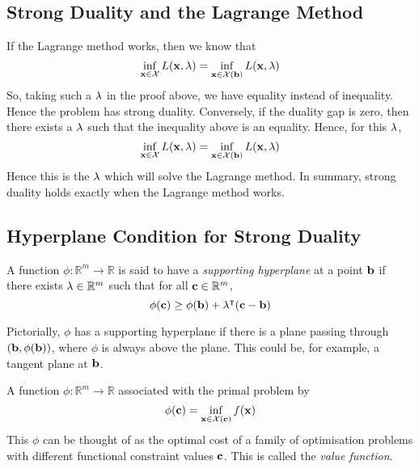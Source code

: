 \subsection{Strong Duality and the Lagrange Method}
If the Lagrange method works, then we know that
\[
	\inf_{\vb x \in \mathcal X} L(\vb x, \vb \lambda) = \inf_{\vb x \in \mathcal X(\vb b)} L(\vb x, \vb \lambda)
\]
So, taking such a \( \vb \lambda \) in the proof above, we have equality instead of inequality.
Hence the problem has strong duality.
Conversely, if the duality gap is zero, then there exists a \( \vb \lambda \) such that the inequality above is an equality.
Hence, for this \( \vb \lambda \),
\[
	\inf_{\vb x \in \mathcal X} L(\vb x, \vb \lambda) = \inf_{\vb x \in \mathcal X(\vb b)} L(\vb x, \vb \lambda)
\]
Hence this is the \( \vb \lambda \) which will solve the Lagrange method.
In summary, strong duality holds exactly when the Lagrange method works.

\subsection{Hyperplane Condition for Strong Duality}
\begin{definition}
	A function \( \phi \colon \mathbb R^m \to \mathbb R \) is said to have a \textit{supporting hyperplane} at a point \( \vb b \) if there exists \( \vb \lambda \in \mathbb R^m \) such that for all \( \vb c \in \mathbb R^m \),
	\[
		\phi(\vb c) \geq \phi(\vb b) + \vb\lambda^\intercal (\vb c - \vb b)
	\]
\end{definition}
\noindent Pictorially, \( \phi \) has a supporting hyperplane if there is a plane passing through \( (\vb b, \phi(\vb b)) \), where \( \phi \) is always above the plane.
This could be, for example, a tangent plane at \( \vb b \).

\begin{definition}
	A function \( \phi \colon \mathbb R^m \to \mathbb R \) associated with the primal problem by
	\[
		\phi(\vb c) = \inf_{\vb x \in \mathcal X(\vb c)} f(\vb x)
	\]
	This \( \phi \) can be thought of as the optimal cost of a family of optimisation problems with different functional constraint values \( \vb c \).
	This is called the \textit{value function}.
\end{definition}

